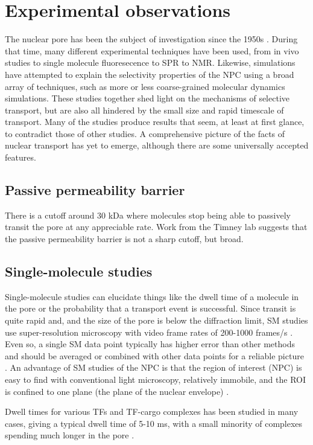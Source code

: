 \section{Experimental observations} 
The nuclear pore has been the subject of investigation since the 1950s \cite{hapensomething16 or another review article with timeline}.  During that time, many different experimental techniques have been used, from in vivo studies to single molecule fluoresecence to SPR to NMR.  Likewise, simulations have attempted to explain the selectivity properties of the NPC using a broad array of techniques, such as more or less coarse-grained molecular dynamics simulations.  These studies together shed light on the mechanisms of selective transport, but are also all hindered by the small size and rapid timescale of transport.  Many of the studies produce results that seem, at least at first glance, to contradict those of other studies.  A comprehensive picture of the facts of nuclear transport has yet to emerge, although there are some universally accepted features.
\subsection{Passive permeability barrier}
There is a cutoff around 30 kDa where molecules stop being able to passively transit the pore at any appreciable rate.  Work from the Timney lab suggests that the passive permeability barrier is not a sharp cutoff, but broad.
\subsection{Single-molecule studies}
Single-molecule studies can elucidate things like the dwell time of a molecule in the pore or the probability that a transport event is successful.  Since transit is quite rapid and, and the size of the pore is below the diffraction limit, SM studies use super-resolution microscopy with video frame rates of 200-1000 frames/s \cite{tu11}.  Even so, a single SM data point typically has higher error than other methods and should be averaged or combined with other data points for a reliable picture \cite{tu11}.  An advantage of SM studies of the NPC is that the region of interest (NPC) is easy to find with conventional light microscopy, relatively immobile, and the ROI is confined to one plane (the plane of the nuclear envelope) \cite{tu11}.

Dwell times for various TFs and TF-cargo complexes has been studied in many cases, giving a typical dwell time of 5-10 ms, with a small minority of complexes spending much longer in the pore \cite{tu11}.


